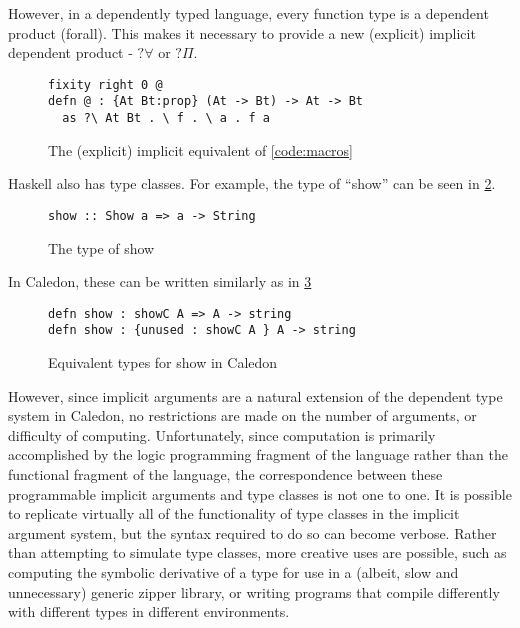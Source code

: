 However, in a dependently typed language, every function type is a dependent product
(forall).  This makes it necessary to provide a new (explicit) implicit dependent product - $?\forall$ or $?\Pi$.


\begin{figure}[H]
\begin{lstlisting}
fixity right 0 @
defn @ : {At Bt:prop} (At -> Bt) -> At -> Bt
  as ?\ At Bt . \ f . \ a . f a

\end{lstlisting}
\caption{The (explicit) implicit equivalent of \ref{code:macros}}
\label{code:expimp}
\end{figure}

Haskell also has type classes. For example, the type of “show” can be seen in \ref{code:showty}.

\begin{figure}[H]
\begin{lstlisting}
show :: Show a => a -> String
\end{lstlisting}
\caption{The type of show}
\label{code:showty}
\end{figure}

In Caledon, these can be written similarly as in \ref{code:cshowty}

\begin{figure}[H]
\begin{lstlisting}
defn show : showC A => A -> string
defn show : {unused : showC A } A -> string
\end{lstlisting}
\caption{Equivalent types for show in Caledon}
\label{code:cshowty}
\end{figure}

However, since implicit arguments are a natural extension of the dependent type
system in Caledon, no restrictions are made on the number of arguments, or difficulty
of computing. Unfortunately, since computation is primarily accomplished by the logic
programming fragment of the language rather than the functional fragment of the language,
the correspondence between these programmable implicit arguments and type
classes is not one to one. It is possible to replicate virtually all of the functionality of
type classes in the implicit argument system, but the syntax required to do so can become
verbose. Rather than attempting to simulate type classes, more creative uses are
possible, such as computing the symbolic derivative of a type for use in a (albeit, slow
and unnecessary) generic zipper library, or writing programs that compile differently
with different types in different environments.




